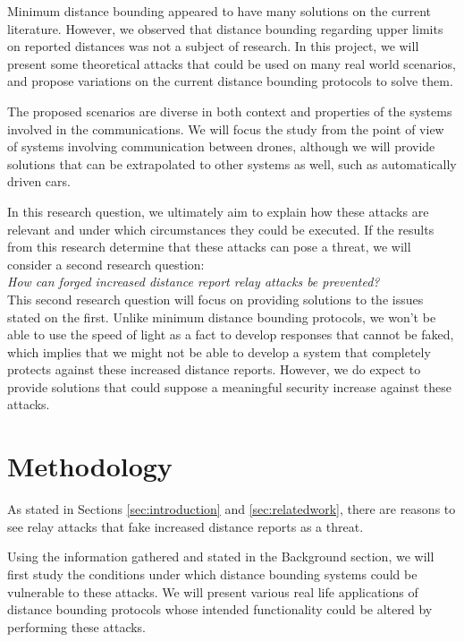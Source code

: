 \documentclass{article}
\begin{document}
Minimum distance bounding appeared to have many solutions on the current literature. However, we observed that distance bounding regarding upper limits on reported distances was not a subject of research. In this project, we will present some theoretical attacks that could be used on many real world scenarios, and propose variations on the current distance bounding protocols to solve them.

The proposed scenarios are diverse in both context and properties of the systems involved in the communications. We will focus the study from the point of view of systems involving communication between drones, although we will provide solutions that can be extrapolated to other systems as well, such as automatically driven cars.

In this research question, we ultimately aim to explain how these attacks are relevant and under which circumstances they could be executed. If the results from this research determine that these attacks can pose a threat, we will consider a second research question:\\

\emph{How can forged increased distance report relay attacks be prevented?}\\

This second research question will focus on providing solutions to the issues stated on the first. Unlike minimum distance bounding protocols, we won't be able to use the speed of light as a fact to develop responses that cannot be faked, which implies that we might not be able to develop a system that completely protects against these increased distance reports. However, we do expect to provide solutions that could suppose a meaningful security increase against these attacks.









\section{Methodology}
\label{sec:methodology}

As stated in Sections \ref{sec:introduction} and \ref{sec:relatedwork}, there are reasons to see relay attacks that fake increased distance reports as a threat.

Using the information gathered and stated in the Background section, we will first study the conditions under which distance bounding systems could be vulnerable to these attacks. We will present various real life applications of distance bounding protocols whose intended functionality could be altered by performing these attacks.
\end{document}

